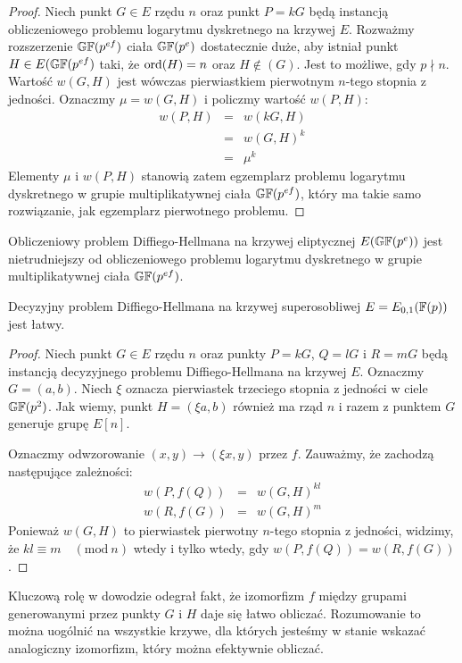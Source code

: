 \begin{proof}
Niech punkt $G \in E$ rzędu $n$
oraz punkt $P = kG$ będą instancją
obliczeniowego problemu logarytmu dyskretnego na krzywej $E$.
Rozważmy rozszerzenie $\mathbb{GF}(p^{ef})$ ciała $\mathbb{GF}(p^e)$ dostatecznie duże,
aby istniał punkt $H \in E(\mathbb{GF}(p^{ef})$ taki,
że $\operatorname{ord}(H) = n$ oraz $H \notin (G)$.
Jest to możliwe, gdy $p \nmid n$.
Wartość $w(G, H)$ jest wówczas
pierwiastkiem pierwotnym $n$-tego stopnia z jedności.
Oznaczmy $\mu = w(G, H)$ i policzmy wartość $w(P, H)$:
\begin{eqnarray*}
w(P, H)
& = & w(kG, H) \\
& = & w(G, H)^k \\
& = & \mu^k
\end{eqnarray*}
Elementy $\mu$ i $w(P, H)$ stanowią zatem
egzemplarz problemu logarytmu dyskretnego
w grupie multiplikatywnej ciała $\mathbb{GF}(p^{ef})$,
który ma takie samo rozwiązanie, jak egzemplarz pierwotnego problemu.
\end{proof}

\begin{corollary}
Obliczeniowy problem Diffiego-Hellmana na krzywej eliptycznej $E(\mathbb{GF}(p^e))$
jest nietrudniejszy od obliczeniowego problemu logarytmu dyskretnego
w grupie multiplikatywnej ciała $\mathbb{GF}(p^{ef})$.
\end{corollary}

\begin{theorem}
Decyzyjny problem Diffiego-Hellmana
na krzywej superosobliwej $E = E_{0,1}(\mathbb{F}(p))$
jest łatwy.
\end{theorem}

\begin{proof}
Niech punkt $G \in E$ rzędu $n$
oraz punkty $P = kG$, $Q = lG$ i $R = mG$
będą instancją decyzyjnego problemu Diffiego-Hellmana na krzywej $E$.
Oznaczmy $G = (a, b)$.
Niech $\xi$ oznacza pierwiastek trzeciego stopnia z jedności w ciele $\mathbb{GF}(p^2)$.
Jak wiemy, punkt $H = (\xi a, b)$ również ma rząd $n$
i razem z punktem $G$ generuje grupę $E[n]$.

\noindent
Oznaczmy odwzorowanie $(x, y) \to (\xi x, y)$ przez $f$.
Zauważmy, że zachodzą następujące zależności:
\begin{eqnarray*}
w(P, f(Q)) & = & w(G, H)^{kl} \\
w(R, f(G)) & = & w(G, H)^m
\end{eqnarray*}
Ponieważ $w(G, H)$ to pierwiastek pierwotny $n$-tego stopnia z jedności,
widzimy, że $kl \equiv m \quad (\mathrm{mod}\ n)$ wtedy i tylko wtedy, gdy
$w(P, f(Q)) = w(R, f(G))$.
\end{proof}

\begin{remark}
Kluczową rolę w dowodzie odegrał fakt, że izomorfizm $f$
między grupami generowanymi przez punkty $G$ i $H$ daje się łatwo obliczać.
Rozumowanie to można uogólnić na wszystkie krzywe,
dla których jesteśmy w stanie wskazać analogiczny izomorfizm,
który można efektywnie obliczać.
\end{remark}
